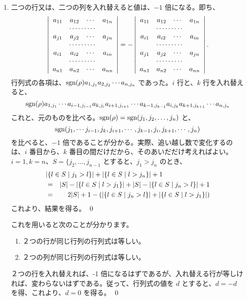 \begin{enumerate}
\item 二つの行又は、二つの列を入れ替えると値は、$-1$ 倍になる。即ち、
$$\left|\begin{array}{cccc}a_{11} & a_{12} & \cdots & a_{1n} \\
\multicolumn{4}{c}{\cdots\cdots\cdots}\\
a_{j1} & a_{j2} & \cdots & a_{jn}\\
\multicolumn{4}{c}{\cdots\cdots\cdots}\\
a_{i1} & a_{i2} & \cdots & a_{in}\\
\multicolumn{4}{c}{\cdots\cdots\cdots}\\
a_{n1} & a_{n2} & \cdots & a_{nn}
\end{array}\right| = - 
\left|\begin{array}{cccc}a_{11} & a_{12} & \cdots & a_{1n} \\
\multicolumn{4}{c}{\cdots\cdots\cdots}\\
a_{i1} & a_{i2} & \cdots & a_{in}\\
\multicolumn{4}{c}{\cdots\cdots\cdots}\\
a_{j1} & a_{j2} & \cdots & a_{jn}\\
\multicolumn{4}{c}{\cdots\cdots\cdots}\\
a_{n1} & a_{n2} & \cdots & a_{nn}
\end{array}\right|.$$
	\proof
	行列式の各項は、$\mbox{{\rm sgn}}(\rho)a_{1,j_1}a_{2,j_2}\cdots a_{n,j_n}$ であった。$i$ 行と、$k$ 行を入れ替えると、
	$$\mbox{{\rm sgn}}(\rho)a_{1,j_1}\cdots a_{i-1,j_{i-1}}a_{k,j_i}a_{i+1,j_{i+1}}\cdots a_{k-1,j_{k-1}}a_{i,j_k}a_{k+1,j_{k+1}}\cdots a_{n,j_n}$$
	これと、元のものを比べる。$\mbox{{\rm sgn}}(\rho) = \mbox{{\rm sgn}}(j_1,j_2,\ldots, j_n)$ と、
	$$\mbox{{\rm sgn}}(j_1,\cdots j_{i-1}, j_k, j_{i+1},\cdots, j_{k-1},j_i,j_{k+1},\cdots, j_n)$$ 
	を比べると、$-1$ 倍であることが分かる。実際、追い越し数で変化するのは、$i$ 番目から、$k$ 番目の間だけだから、そのあいだだけ考えればよい。$i = 1, k=n$、$S = \{j_2,\ldots, j_{n-1}$ とすると、$j_1>j_n$ のとき、
	\begin{eqnarray*}
	\lefteqn{|\{l\in S\mid j_1>l\}| + |\{l\in S\mid l>j_{n}\}| + 1}\\
	& = & |S| - |\{l\in S\mid l>j_1\}| + |S| - |\{l\in S \mid j_{n}>l\}| + 1\\
	& = & 2|S| + 1 - (|\{l\in S \mid j_{n}>l\}| + |\{l\in S\mid l>j_1\}| )
	\end{eqnarray*}
	これより、結果を得る。
	\qed

これを用いると次のことが分かります。
	\begin{enumerate}
	\item ２つの行が同じ行列の行列式は等しい。
	\item ２つの列が同じ行列の行列式は等しい。
	\end{enumerate}
	\proof 
	２つの行を入れ替えれば、-1 倍になるはずであるが、入れ替える行が等しければ、変わらないはずである。従って、行列式の値を $d$ とすると、$d = -d$ を得、これより、$d = 0$ を得る。
	\qed
	

\end{enumerate}

